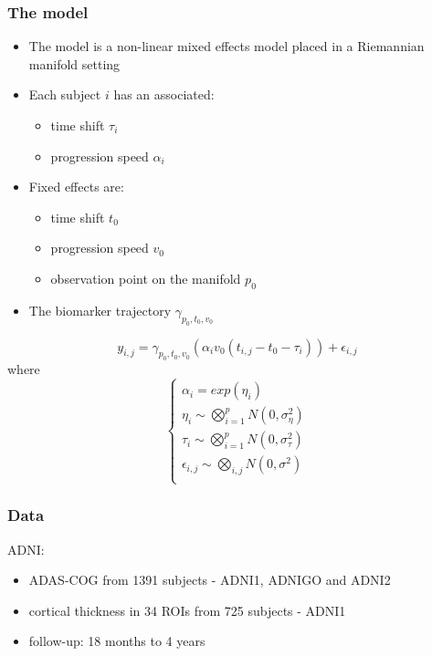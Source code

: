 \documentclass[10pt,xcolor=table]{beamer}
\begin{document}
\begin{frame}
\frametitle{The model}

\begin{itemize}

 \item The model is a non-linear mixed effects model placed in a Riemannian manifold setting
  \item Each subject $i$ has an associated:
  \begin{itemize}
  \item time shift $\tau_i$
  \item progression speed $\alpha_i$
  \end{itemize}
  \item Fixed effects are:
  \begin{itemize}
  \item time shift $t_0$
  \item progression speed $v_0$
  \item observation point on the manifold $p_0$
  \end{itemize}
  \item The biomarker trajectory $\gamma_{p_0,t_0,v_0}$


\end{itemize}


\begin{equation}
  y_{i,j} = \gamma_{p_0,t_0,v_0}(\alpha_iv_0(t_{i,j}-t_0-\tau_i))+\epsilon_{i,j} 
\end{equation}
where
\begin{equation}
\label{eq:manifold2}
\begin{cases}
  \alpha_i = exp(\eta_i)\\
  \eta_i \sim \bigotimes_{i=1}^p N(0, \sigma_{\eta}^2)\\  
  \tau_i \sim \bigotimes_{i=1}^p N(0, \sigma_{\tau}^2)\\  
  \epsilon_{i,j} \sim \bigotimes_{i,j} N(0, \sigma^2)\\  
\end{cases}
\end{equation}

\end{frame}

\begin{frame}
\frametitle{Data}

ADNI:
\begin{itemize}
 \item ADAS-COG from 1391 subjects - ADNI1, ADNIGO and ADNI2
 \item cortical thickness in 34 ROIs from 725 subjects - ADNI1 
 \item follow-up: 18 months to 4 years
 
\end{itemize}


\end{frame}
\end{document}
